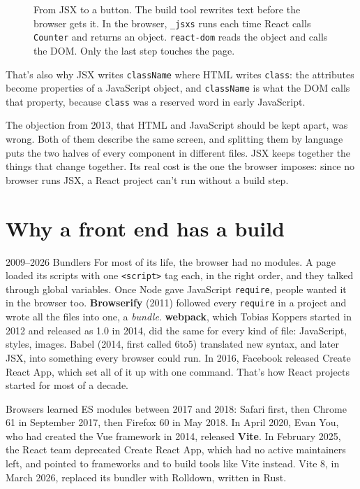 \begin{figure}[htbp]
\caption{From JSX to a button. The build tool rewrites text before the browser
gets it. In the browser, \texttt{\_jsxs} runs each time React calls
\texttt{Counter} and returns an object. \texttt{react-dom} reads the object and
calls the DOM. Only the last step touches the page.}
\label{fig:jsx-steps}
\end{figure}

That's also why JSX writes \texttt{className} where HTML writes
\texttt{class}: the attributes become properties of a JavaScript object, and
\texttt{className} is what the DOM calls that property, because \texttt{class}
was a reserved word in early JavaScript.

The objection from 2013, that HTML and JavaScript should be kept apart, was
wrong. Both of them describe the same screen, and splitting them by language
puts the two halves of every component in different files. JSX keeps together
the things that change together. Its real cost is the one the browser imposes:
since no browser runs JSX, a React project can't run without a build step.

\section{Why a front end has a build}

\begin{history}{2009--2026 \textperiodcentered{} Bundlers}
For most of its life, the browser had no modules. A page loaded its scripts
with one \texttt{<script>} tag each, in the right order, and they talked through
global variables. Once Node gave JavaScript \texttt{require}, people wanted it in
the browser too. \textbf{Browserify} (2011) followed every \texttt{require} in a
project and wrote all the files into one, a \emph{bundle}. \textbf{webpack},
which Tobias Koppers started in 2012 and released as 1.0 in 2014, did the same
for every kind of file: JavaScript, styles, images. Babel (2014, first called
6to5) translated new syntax, and later JSX, into something every browser could
run. In 2016, Facebook released Create React App, which set all of it up with
one command. That's how React projects started for most of a decade.

Browsers learned ES modules between 2017 and 2018: Safari first, then Chrome
61 in September 2017, then Firefox 60 in May 2018. In April 2020, Evan You,
who had created the Vue framework in 2014, released \textbf{Vite}. In
February 2025, the React team deprecated Create React App, which had no active
maintainers left, and pointed to frameworks and to build tools like Vite
instead. Vite 8, in March 2026, replaced its bundler with Rolldown, written in
Rust.
\end{history}

